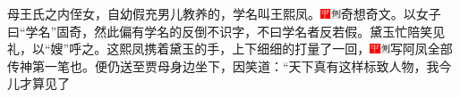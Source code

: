 母王氏之内侄女，自幼假充男儿教养的，学名叫王熙凤。{\includegraphics[width=3mm]{../Images/00002}\includegraphics[width=3mm]{../Images/00011}\footnotesize \kaishu 奇想奇文。以女子曰``学名''固奇，然此偏有学名的反倒不识字，不曰学名者反若假。}黛玉忙陪笑见礼，以``嫂''呼之。这熙凤携着黛玉的手，上下细细的打量了一回，{\includegraphics[width=3mm]{../Images/00002}\includegraphics[width=3mm]{../Images/00011}\footnotesize \kaishu 写阿凤全部传神第一笔也。}便仍送至贾母身边坐下，因笑道：``天下真有这样标致人物，我今儿才算见了